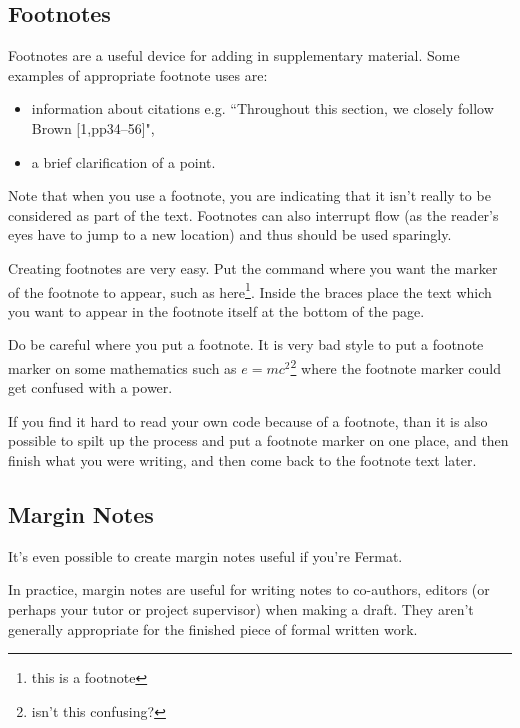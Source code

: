 \documentclass[a4paper,11pt]{article}
\begin{document}
\subsection{Footnotes}

Footnotes are a useful device for adding in supplementary material. Some examples of appropriate footnote uses are:
\begin{itemize}
\item information about citations e.g. ``Throughout this section, we closely follow  Brown [1,pp34--56]",
\item a brief clarification of a point.
\end{itemize}

Note that when you use a footnote, you are indicating that it isn't really to be considered as part of the text. Footnotes can also interrupt flow (as the reader's eyes have to jump to a new location) and thus should be used sparingly.

Creating footnotes are very easy. Put the command where you want the marker of the footnote to appear, such as here\footnote{this is a footnote}. Inside the braces place the text which you want to appear in the footnote itself at the bottom of the page.

Do be careful where you put a footnote. It is very bad style to put a footnote marker on some mathematics such as $e=mc^2$\footnote{isn't this confusing?} where the footnote marker could get confused with a power.

If you find it hard to read your own code because of a footnote, than it is also possible to spilt up the process and put a footnote marker on one place\footnotemark, and then finish what you were writing, and then come back to the footnote text later.




\subsection{Margin Notes}

It's even possible to create margin notes   useful if you're Fermat.

In practice, margin notes are useful for writing notes to co-authors, editors (or perhaps your tutor or project supervisor) when making a draft. They aren't generally appropriate for the finished piece of formal written work.
\end{document}
